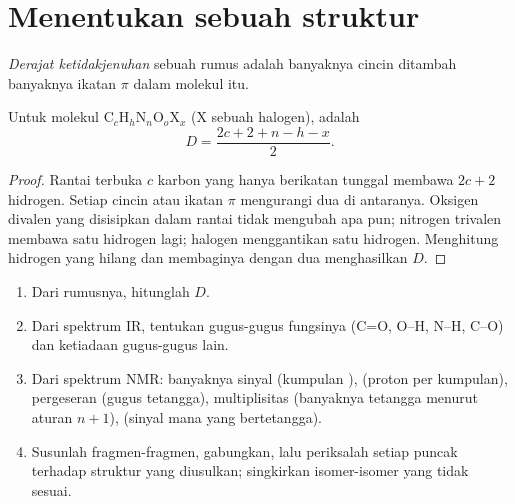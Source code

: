 \section{Menentukan sebuah struktur}

\begin{definition}\label{def:b1:structure-spectroscopy:unsaturation}
\emph{Derajat ketidakjenuhan} sebuah rumus
adalah banyaknya cincin ditambah banyaknya ikatan $\pi$ dalam molekul
itu.
\end{definition}

\begin{proposition}\label{prop:b1:structure-spectroscopy:unsaturation-formula}
Untuk molekul $\mathrm{C}_c\mathrm{H}_h\mathrm{N}_n\mathrm{O}_o\mathrm{X}_x$
(X sebuah halogen),  adalah
\[
  D = \frac{2c + 2 + n - h - x}{2} .
\]
\end{proposition}

\begin{proof}
Rantai terbuka $c$ karbon yang hanya berikatan tunggal membawa $2c + 2$
hidrogen. Setiap cincin atau ikatan $\pi$ mengurangi dua di antaranya.
Oksigen divalen yang disisipkan dalam rantai tidak mengubah apa pun;
nitrogen trivalen membawa satu hidrogen lagi; halogen menggantikan satu
hidrogen. Menghitung hidrogen yang hilang dan membaginya dengan dua
menghasilkan $D$.
\end{proof}

\begin{method}\label{met:b1:structure-spectroscopy:solve-structure}
\begin{enumerate}
  \item Dari rumusnya, hitunglah $D$.
  \item Dari spektrum IR, tentukan gugus-gugus fungsinya (C=O, O--H,
        N--H, C--O) dan ketiadaan gugus-gugus lain.
  \item Dari spektrum NMR: banyaknya sinyal (kumpulan ),
         (proton per kumpulan), pergeseran (gugus tetangga),
        multiplisitas (banyaknya tetangga menurut aturan $n + 1$),
         (sinyal mana yang bertetangga).
  \item Susunlah fragmen-fragmen, gabungkan, lalu periksalah setiap puncak
        terhadap struktur yang diusulkan; singkirkan isomer-isomer yang
        tidak sesuai.
\end{enumerate}
\end{method}

